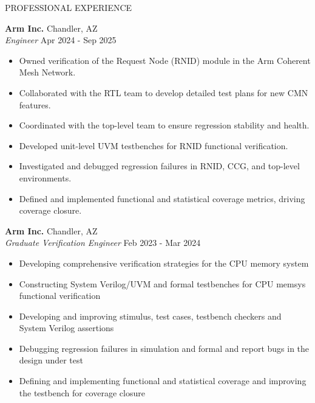 \documentclass{resume} %
\newcommand{\myitemsep}{\itemsep -0.6em}
\begin{document}
  \begin{rSection}{PROFESSIONAL EXPERIENCE}

    \textbf{Arm Inc.}                           \hfill Chandler, AZ         \\
    \emph{Engineer}                             \hfill Apr 2024 - Sep 2025   \\
    \LineShrinkBeforeItem
    \begin{itemize} [leftmargin=1em]
      \myitemsep
      \item Owned verification of the Request Node (RNID) module in the Arm Coherent Mesh Network.
      \item Collaborated with the RTL team to develop detailed test plans for new CMN features.
      \item Coordinated with the top-level team to ensure regression stability and health.
      \item Developed unit-level UVM testbenches for RNID functional verification.
      \item Investigated and debugged regression failures in RNID, CCG, and top-level environments.
      \item Defined and implemented functional and statistical coverage metrics, driving coverage closure.
    \end{itemize}

    \textbf{Arm Inc.}                           \hfill Chandler, AZ         \\
    \emph{Graduate Verification Engineer}       \hfill Feb 2023 - Mar 2024  \\
    \LineShrinkBeforeItem
    \begin{itemize} [leftmargin=1em]
      \myitemsep
      \item Developing comprehensive verification strategies for the CPU memory system
      \item Constructing System Verilog/UVM and formal testbenches for CPU memsys functional verification
      \item Developing and improving stimulus, test cases, testbench checkers and System Verilog assertions
      \item Debugging regression failures in simulation and formal and report bugs in the design under test
      \item Defining and implementing functional and statistical coverage and improving the testbench for coverage closure
    \end{itemize}


\end{rSection}
\end{document}
